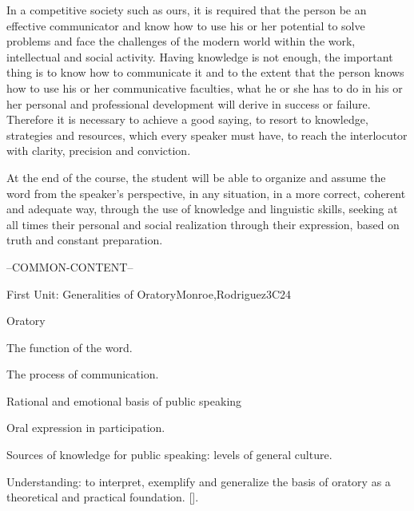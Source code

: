 \begin{syllabus}


\begin{justification}
	In a competitive society such as ours, it is required that the person be an effective communicator and know how to use his or her potential to solve problems and face the challenges of the modern world within the work, intellectual and social activity. Having knowledge is not enough, the important thing is to know how to communicate it and to the extent that the person knows how to use his or her communicative faculties, what he or she has to do in his or her personal and professional development will derive in success or failure. Therefore it is necessary to achieve a good saying, to resort to knowledge, strategies and resources, which every speaker must have, to reach the interlocutor with clarity, precision and conviction.
\end{justification}

\begin{goals}
\item At the end of the course, the student will be able to organize and assume the word from the speaker's perspective, in any situation, in a more correct, coherent and adequate way, through the use of knowledge and linguistic skills, seeking at all times their personal and social realization through their expression, based on truth and constant preparation.
\end{goals}

--COMMON-CONTENT--

\begin{unit}{}{First Unit: Generalities of Oratory}{Monroe,Rodriguez}{3}{C24}
\begin{topics}
	\item Oratory
	\item The function of the word.
	\item The process of communication.
	\item Rational and emotional basis of public speaking
		\begin{subtopics}
			\item Oral expression in participation.
		\end{subtopics}

	\item Sources of knowledge for public speaking: levels of general culture.
\end{topics}
\begin{learningoutcomes}
	\item Understanding: to interpret, exemplify and generalize the basis of oratory as a theoretical and practical foundation. [\Usage].
\end{learningoutcomes}
\end{unit}


\end{syllabus}
